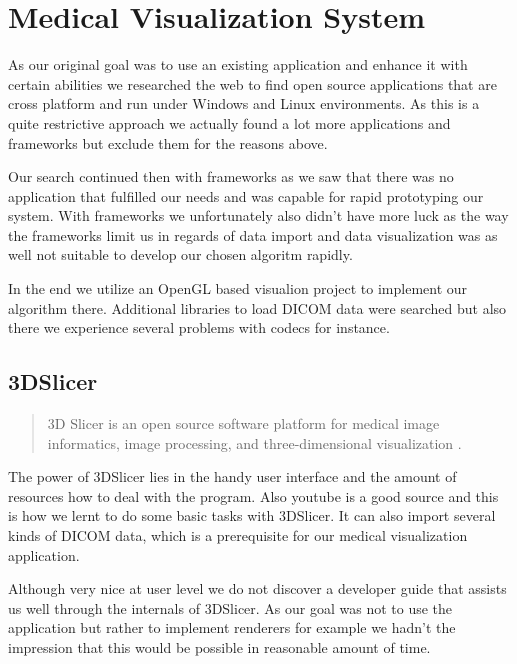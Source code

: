 \section{Medical Visualization System}

As our original goal was to use an existing application and enhance it with certain abilities we researched the web to find open source applications that are cross platform and run under Windows and Linux environments.
As this is a quite restrictive approach we actually found a lot more applications and frameworks but exclude them for the reasons above.

Our search continued then with frameworks as we saw that there was no application that fulfilled our needs and was capable for rapid prototyping our system.
With frameworks we unfortunately also didn't have more luck as the way the frameworks limit us in regards of data import and data visualization was as well not suitable to develop our chosen algoritm rapidly.

In the end we utilize an OpenGL based visualion project to implement our algorithm there. Additional libraries to load DICOM data were searched but also there we experience several problems with codecs for instance.

%

\subsection{3DSlicer}

\blockquote{3D Slicer is an open source software platform for medical image informatics, image processing, and three-dimensional visualization \cite{3DSlicer_2018}.}

The power of 3DSlicer lies in the handy user interface and the amount of resources how to deal with the program. Also youtube is a good source and this is how we lernt to do some basic tasks with 3DSlicer. It can also import several kinds of DICOM data, which is a prerequisite for our medical visualization application.

Although very nice at user level we do not discover a developer guide that assists us well through the internals of 3DSlicer.
As our goal was not to use the application but rather to implement renderers for example we hadn't the impression that this would be possible in reasonable amount of time.

